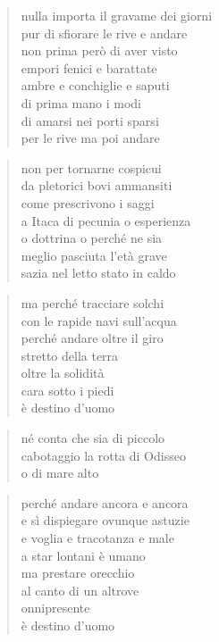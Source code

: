 	\begin{verse}
		nulla importa il gravame dei giorni\\
		pur di sfiorare le rive e andare\\
		non prima però di aver visto\\
		empori fenici e barattate\\
		ambre e conchiglie e saputi\\
		di prima mano i modi\\
		di amarsi nei porti sparsi\\
		per le rive ma poi andare
	\end{verse}

	\begin{verse}
		non per tornarne cospicui\\
		da pletorici bovi ammansiti\\
		come prescrivono i saggi\\
		a Itaca di pecunia o esperienza\\
		o dottrina o perché ne sia\\
		meglio pasciuta l’età grave\\
		sazia nel letto stato in caldo
	\end{verse}

	\begin{verse}
		ma perché tracciare solchi\\
		con le rapide navi sull’acqua\\
		perché andare oltre il giro\\
		stretto della terra\\
		oltre la solidità\\
		cara sotto i piedi\\
		è destino d’uomo
	\end{verse}

	\begin{verse}
		né conta che sia di piccolo\\
		cabotaggio la rotta di Odisseo\\
		o di mare alto
	\end{verse}

	\begin{verse}
		perché andare ancora e ancora\\
		e sì dispiegare ovunque astuzie\\
		e voglia e tracotanza e male\\
		a star lontani è umano\\
		ma prestare orecchio\\
		al canto di un altrove\\
		onnipresente\\
		è destino d’uomo
	\end{verse}

